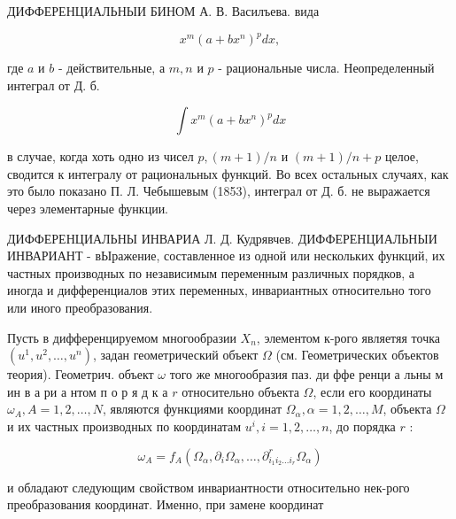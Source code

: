 \documentclass[10pt]{article}
\begin{document}
ДИФФЕРЕНЦИАЛЬНЫИ БИНОМ А. В. Василъева. вида



\[

x^{m}\left(a+b x^{n}\right)^{p} d x,

\]



где $a$ и $b$ - действительные, а $m, n$ и $p$ - рациональные числа. Неопределенный интеграл от Д. б.



\[

\int x^{m}\left(a+b x^{n}\right)^{p} d x

\]



в случае, когда хоть одно из чисел $p,(m+1) / n$ и $(m+1) / n+p$ целое, сводится к интегралу от рациональных функций. Во всех остальных случаях, как это было показано П. Л. Чебышевым (1853), интеграл от Д. б. не выражается через элементарные функции.



ДИФФЕРЕНЦИАЛЬНЫ ИНВАРИА Л. Д. Кудрявчев. ДИФФЕРЕНЦИАЛЬНЫИ ИНВАРИАНТ - вЫражение, составленное из одной или нескольких функций, их частных производных по независимым переменным различных порядков, а иногда и дифференциалов этих переменных, инвариантных относительно того или иного преобразования.



Пусть в дифференцируемом многообразии $X_{n}$, элементом к-рого являетяя точка $\left(u^{1}, u^{2}, \ldots, u^{n}\right)$, задан геометрический объект $\Omega$ (см. Геометрических объектов теория). Геометрич. объект $\omega$ того же многообразия паз. ди ффе ренци а льны м ин в а ри а нтом п о р я д к а $r$ относительно объекта $\Omega$, если его координаты $\omega_{A}, A=1,2, \ldots, N$, являются функциями координат $\Omega_{\alpha}, \alpha=1,2, \ldots, M$, объекта $\Omega$ и их частных производных по координатам $u^{i}, i=1,2, \ldots, n$, до порядка $r$ :



\[

\omega_{A}=f_{A}\left(\Omega_{\alpha}, \partial_{i} \Omega_{\alpha}, \ldots, \partial_{i_{1} i_{2} \ldots i_{r}}^{r} \Omega_{\alpha}\right)

\]



и обладают следующим свойством инвариантности относительно нек-рого преобразования координат. Именно, при замене координат
\end{document}
